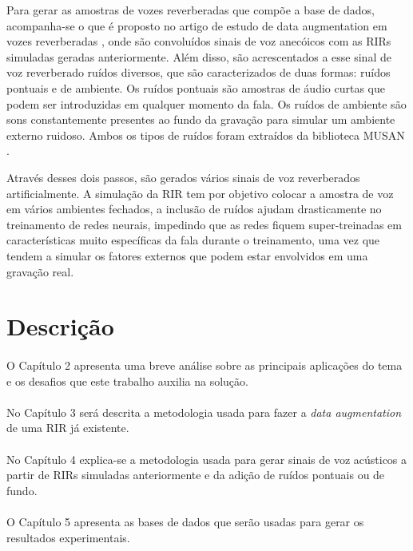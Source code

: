 Para gerar as amostras de vozes reverberadas que compõe a base de dados, acompanha-se o que é proposto no artigo de estudo de data
augmentation em vozes reverberadas \cite{Speech_Rec}, onde são convoluídos sinais de voz anecóicos com as RIRs simuladas geradas anteriormente.
Além disso, são acrescentados a esse sinal de voz reverberado ruídos diversos, que são caracterizados de duas formas: ruídos pontuais e de ambiente.
Os ruídos pontuais são amostras de áudio curtas que podem ser introduzidas em qualquer momento da fala. Os ruídos de ambiente são sons constantemente
presentes ao fundo da gravação para simular um ambiente externo ruidoso. Ambos os tipos de ruídos foram extraídos da biblioteca MUSAN \cite{noiseLib}.

Através desses dois passos, são gerados vários sinais de voz reverberados artificialmente. A simulação da RIR tem por objetivo colocar
a amostra de voz em vários ambientes fechados, a inclusão de ruídos ajudam drasticamente no treinamento de redes neurais, impedindo que as redes fiquem
super-treinadas em características muito específicas da fala durante o treinamento, uma vez que tendem a simular 
os fatores externos que podem estar envolvidos em uma gravação real.


\section{Descrição}

\paragraph{}O Capítulo 2 apresenta uma breve análise sobre as principais aplicações do tema e os desafios que este trabalho auxilia na solução.

\paragraph{}No Capítulo 3 será descrita a metodologia usada para fazer a \textit{data augmentation} de uma RIR já existente.

\paragraph{}No Capítulo 4 explica-se a metodologia usada para gerar sinais de voz acústicos a partir de RIRs simuladas anteriormente e da adição
de ruídos pontuais ou de fundo.

\paragraph{}O Capítulo 5 apresenta as bases de dados que serão usadas para gerar os resultados experimentais.

